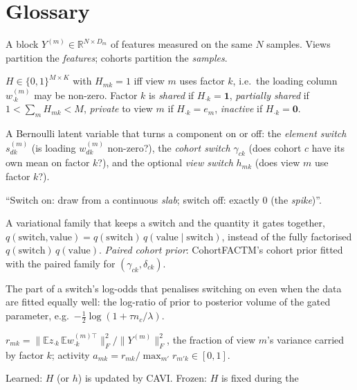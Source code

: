 \documentclass[11pt,a4paper]{article}
\newcommand{\E}{\mathbb{E}}
\theoremstyle{definition}
\theoremstyle{remark}
\begin{document}
\section{Glossary}\label{sec:glossary}
\begin{description}[leftmargin=0pt,itemsep=3pt]
\item[View, modality.] A block $Y^{(m)}\in\mathbb R^{N\times D_m}$ of features measured on the same $N$ samples.
  Views partition the \emph{features}; cohorts partition the \emph{samples}.
\item[View pattern $H$.] $H\in\{0,1\}^{M\times K}$ with $H_{mk}=1$ iff view $m$ uses factor $k$, i.e.\ the loading column
  $w^{(m)}_{\cdot k}$ may be non-zero. Factor $k$ is \emph{shared} if $H_{\cdot k}=\mathbf 1$, \emph{partially shared} if
  $1<\sum_mH_{mk}<M$, \emph{private} to view $m$ if $H_{\cdot k}=e_m$, \emph{inactive} if $H_{\cdot k}=\mathbf 0$.
\item[Switch.] A Bernoulli latent variable that turns a component on or off: the \emph{element switch} $s^{(m)}_{dk}$
  (is loading $w^{(m)}_{dk}$ non-zero?), the \emph{cohort switch} $\gamma_{ck}$ (does cohort $c$ have its own mean on
  factor $k$?), and the optional \emph{view switch} $h_{mk}$ (does view $m$ use factor $k$?).
\item[Spike and slab.] ``Switch on: draw from a continuous \emph{slab}; switch off: exactly $0$ (the \emph{spike})''.
\item[Paired factorisation.] A variational family that keeps a switch and the quantity it gates together,
  $q(\text{switch},\text{value})=q(\text{switch})\,q(\text{value}\mid\text{switch})$, instead of the fully factorised
  $q(\text{switch})\,q(\text{value})$. \emph{Paired cohort prior}: CohortFACTM's cohort prior fitted with the paired family
  for $(\gamma_{ck},\delta_{ck})$.
\item[Occam term.] The part of a switch's log-odds that penalises switching on even when the data are fitted equally
  well: the log-ratio of prior to posterior volume of the gated parameter, e.g.\ $-\tfrac12\log(1+\tau n_c/\lambda)$.
\item[Variance share, activity.] $r_{mk}=\|\E z_{\cdot k}\,\E w^{(m)\top}_{\cdot k}\|_F^2/\|Y^{(m)}\|_F^2$, the fraction of view $m$'s
  variance carried by factor $k$; activity $a_{mk}=r_{mk}/\max_{m'}r_{m'k}\in[0,1]$.
\item[Learned vs frozen (prescribed) pattern.] Learned: $H$ (or $h$) is updated by CAVI. Frozen: $H$ is fixed during the

\end{description}
\end{document}
